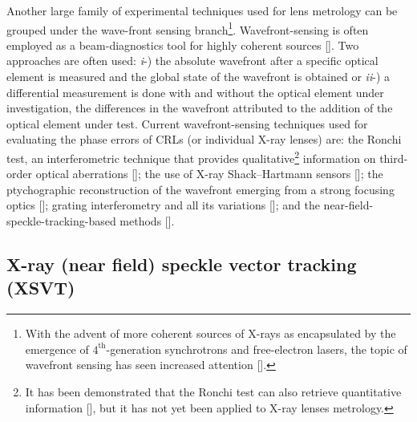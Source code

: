 \begin{refsection}
Another large family of experimental techniques used for lens metrology can be grouped under the wave-front sensing branch\footnote{With the advent of more coherent sources of X-rays as encapsulated by the emergence of $4^{\text{th}}$-generation synchrotrons and free-electron lasers, the topic of wavefront sensing has seen increased attention [\cite{Seaberg2019}].}. Wavefront-sensing is often employed as a beam-diagnostics tool for highly coherent sources [\cite{Seaberg2019}]. Two approaches are often used: \textit{i}-) the absolute wavefront after a specific optical element is measured and the global state of the wavefront is obtained or \textit{ii}-) a differential measurement is done with and without the optical element under investigation, the differences in the wavefront attributed to the addition of the optical element under test. Current wavefront-sensing techniques used for evaluating the phase errors of CRLs (or individual X-ray lenses) are: the Ronchi test, an interferometric technique that provides qualitative\footnote{It has been demonstrated that the Ronchi test can also retrieve quantitative information [\cite{Lee2010}], but it has not yet been applied to X-ray lenses metrology.} information on third-order optical aberrations [\cite{Nilsson2012, Uhlen2014}]; the use of X-ray Shack–Hartmann sensors [\cite{Mayo2004,Mikhaylov2020}]; the ptychographic reconstruction of the wavefront emerging from a strong focusing optics [\cite{Schropp2013,Sala2017,Seiboth2017}]; grating interferometry and all its variations [\cite{David2012,Koch2016,Grizolli2017}]; and the near-field-speckle-tracking-based methods [\cite{Berujon2013,Zdora2018,Berujon2020a}].

\subsection{X-ray (near field) speckle vector tracking (XSVT)}\label{sec:XSVT}%


\end{refsection}
